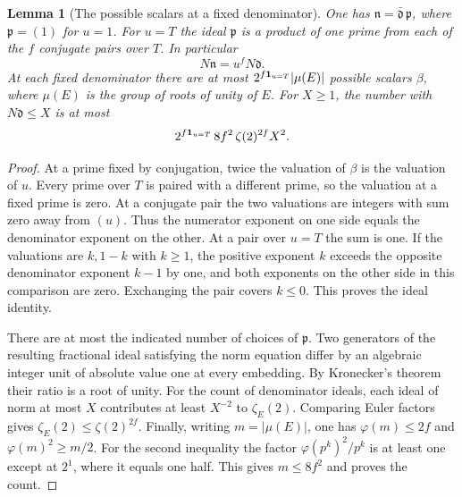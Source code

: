\documentclass[a4paper,11pt]{article}
\newtheorem{lemma}[proposition]{Lemma}
\theoremstyle{definition}
\theoremstyle{remark}
\numberwithin{equation}{section}
\begin{document}
\begin{lemma}[The possible scalars at a fixed denominator]
\leavevmode\label{lem:scalarden562}
One has \(\mathfrak n=\bar{\mathfrak d}\,\mathfrak p\), where
\(\mathfrak p=(1)\) for \(u=1\). For \(u=T\) the ideal
\(\mathfrak p\) is a product of one prime from each of the
\(f\) conjugate pairs over \(T\). In particular
\[
             N\mathfrak n=u^f N\mathfrak d .
\]
At each fixed denominator there are at most
\(2^{f{\bf1}_{u=T}}|\mu(E)|\) possible scalars \(\beta\),
where \(\mu(E)\) is the group of roots of unity of \(E\).
For \(X\ge1\), the number with \(N\mathfrak d\le X\) is at most
\[
             2^{f{\bf1}_{u=T}}\,8f^2\,\zeta(2)^{2f}X^2 .
\]
\end{lemma}
\begin{proof}
At a prime fixed by conjugation, twice the valuation of \(\beta\)
is the valuation of \(u\). Every prime over \(T\) is paired with
a different prime, so the valuation at a fixed prime is zero.
At a conjugate pair the two valuations are integers with sum
zero away from \((u)\). Thus the numerator exponent on one side
equals the denominator exponent on the other. At a pair over
\(u=T\) the sum is one. If the valuations are \(k,1-k\) with
\(k\ge1\), the positive exponent \(k\) exceeds the opposite
denominator exponent \(k-1\) by one, and both exponents on the
other side in this comparison are zero. Exchanging the pair
covers \(k\le0\). This proves the ideal identity.

There are at most the indicated number of choices of
\(\mathfrak p\). Two generators of the resulting fractional
ideal satisfying the norm equation differ by an algebraic
integer unit of absolute value one at every embedding. By
Kronecker's theorem their ratio is a root of unity. For the
count of denominator ideals, each ideal of norm at most \(X\)
contributes at least \(X^{-2}\) to \(\zeta_E(2)\). Comparing
Euler factors gives \(\zeta_E(2)\le\zeta(2)^{2f}\).
Finally, writing \(m=|\mu(E)|\), one has
\(\varphi(m)\le 2f\) and \(\varphi(m)^2\ge m/2\). For the
second inequality the factor \(\varphi(p^k)^2/p^k\) is at
least one except at \(2^1\), where it equals one half. This
gives \(m\le8f^2\) and proves the count.
\end{proof}
\end{document}
